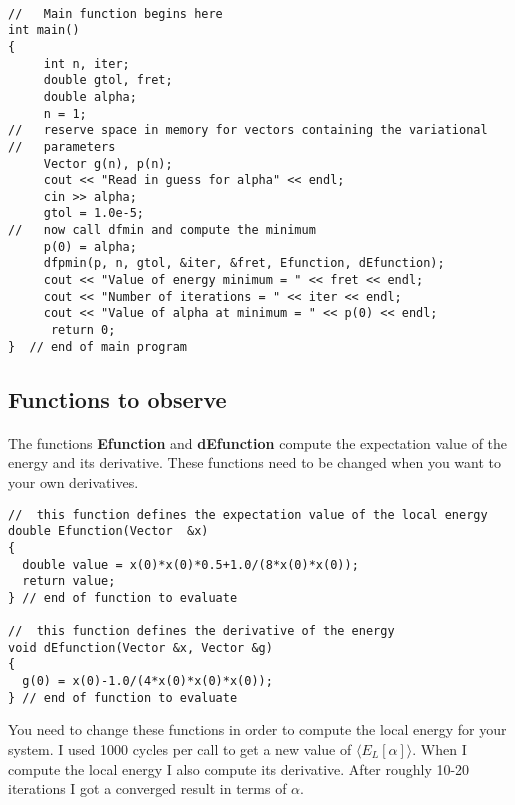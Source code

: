 \documentclass[%
oneside,                 %
final,                   %
10pt]{article}
\begin{document}
\paragraph{}
\begin{verbatim}
//   Main function begins here
int main()
{
     int n, iter;
     double gtol, fret;
     double alpha;
     n = 1;
//   reserve space in memory for vectors containing the variational
//   parameters
     Vector g(n), p(n);
     cout << "Read in guess for alpha" << endl;
     cin >> alpha;
     gtol = 1.0e-5;
//   now call dfmin and compute the minimum
     p(0) = alpha;
     dfpmin(p, n, gtol, &iter, &fret, Efunction, dEfunction);
     cout << "Value of energy minimum = " << fret << endl;
     cout << "Number of iterations = " << iter << endl;
     cout << "Value of alpha at minimum = " << p(0) << endl;
      return 0;
}  // end of main program

\end{verbatim}





\subsection*{Functions to observe}

\paragraph{}
The functions \textbf{Efunction} and \textbf{dEfunction} compute the expectation value of the energy and its derivative.
These functions need to be changed when you want to your own derivatives.
\begin{verbatim}
//  this function defines the expectation value of the local energy
double Efunction(Vector  &x)
{
  double value = x(0)*x(0)*0.5+1.0/(8*x(0)*x(0));
  return value;
} // end of function to evaluate

//  this function defines the derivative of the energy 
void dEfunction(Vector &x, Vector &g)
{
  g(0) = x(0)-1.0/(4*x(0)*x(0)*x(0));
} // end of function to evaluate
\end{verbatim}
You need to change these functions in order to compute the local energy for your system. I used 1000
cycles per call to get a new value of $\langle E_L[\alpha]\rangle$.
When I compute the local energy I also compute its derivative.
After roughly 10-20 iterations I got a converged result in terms of $\alpha$.



\end{document}
